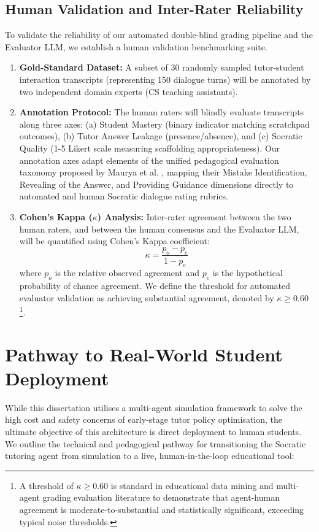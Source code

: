\subsection{Human Validation and Inter-Rater Reliability}
To validate the reliability of our automated double-blind grading pipeline and the Evaluator LLM, we establish a human validation benchmarking suite. 
\begin{enumerate}
    \item \textbf{Gold-Standard Dataset:} A subset of 30 randomly sampled tutor-student interaction transcripts (representing 150 dialogue turns) will be annotated by two independent domain experts (CS teaching assistants).
    \item \textbf{Annotation Protocol:} The human raters will blindly evaluate transcripts along three axes: (a) Student Mastery (binary indicator matching scratchpad outcomes), (b) Tutor Answer Leakage (presence/absence), and (c) Socratic Quality (1-5 Likert scale measuring scaffolding appropriateness). Our annotation axes adapt elements of the unified pedagogical evaluation taxonomy proposed by Maurya et al. \cite{maurya2025unifying}, mapping their Mistake Identification, Revealing of the Answer, and Providing Guidance dimensions directly to automated and human Socratic dialogue rating rubrics.
    \item \textbf{Cohen's Kappa ($\kappa$) Analysis:} Inter-rater agreement between the two human raters, and between the human consensus and the Evaluator LLM, will be quantified using Cohen's Kappa coefficient:
    \begin{equation}
        \kappa = \frac{p_o - p_e}{1 - p_e}
    \end{equation}
    where $p_o$ is the relative observed agreement and $p_e$ is the hypothetical probability of chance agreement. We define the threshold for automated evaluator validation as achieving substantial agreement, denoted by $\kappa \ge 0.60$\footnote{A threshold of $\kappa \ge 0.60$ is standard in educational data mining and multi-agent grading evaluation literature to demonstrate that agent-human agreement is moderate-to-substantial and statistically significant, exceeding typical noise thresholds.}.

\end{enumerate}

\section{Pathway to Real-World Student Deployment}
While this dissertation utilises a multi-agent simulation framework to solve the high cost and safety concerns of early-stage tutor policy optimisation, the ultimate objective of this architecture is direct deployment to human students. We outline the technical and pedagogical pathway for transitioning the Socratic tutoring agent from simulation to a live, human-in-the-loop educational tool:

